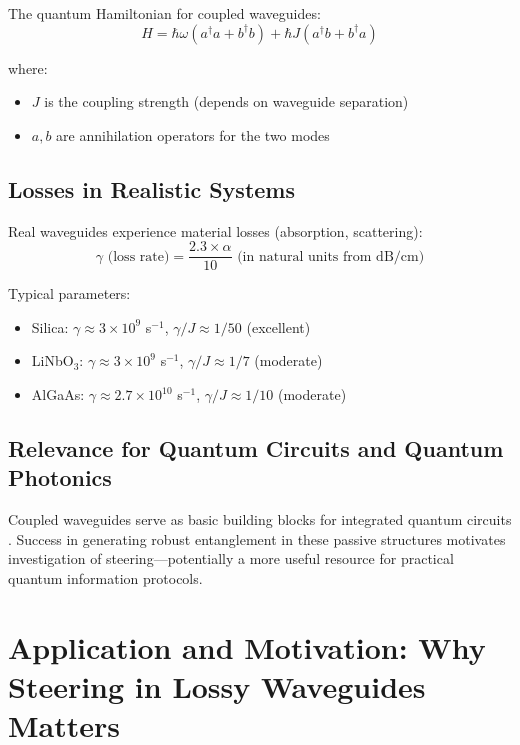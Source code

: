 The quantum Hamiltonian for coupled waveguides:
\begin{equation}
H = \hbar\omega(a^\dagger a + b^\dagger b) + \hbar J(a^\dagger b + b^\dagger a)
\end{equation}

where:
\begin{itemize}
	\item $J$ is the coupling strength (depends on waveguide separation)
	\item $a, b$ are annihilation operators for the two modes
\end{itemize}

\subsection{Losses in Realistic Systems}

Real waveguides experience material losses (absorption, scattering):
\begin{equation}
\gamma \text{ (loss rate)} = \frac{2.3 \times \alpha}{10} \text{ (in natural units from dB/cm)}
\end{equation}

Typical parameters:
\begin{itemize}
	\item Silica: $\gamma \approx 3 \times 10^9$ s$^{-1}$, $\gamma/J \approx 1/50$ (excellent)
	\item LiNbO$_3$: $\gamma \approx 3 \times 10^9$ s$^{-1}$, $\gamma/J \approx 1/7$ (moderate)
	\item AlGaAs: $\gamma \approx 2.7 \times 10^{10}$ s$^{-1}$, $\gamma/J \approx 1/10$ (moderate)
\end{itemize}

\subsection{Relevance for Quantum Circuits and Quantum Photonics}

Coupled waveguides serve as basic building blocks for integrated quantum circuits \cite{PolitiSilicaonSilicon2008}. Success in generating robust entanglement in these passive structures motivates investigation of steering—potentially a more useful resource for practical quantum information protocols.

\section{Application and Motivation: Why Steering in Lossy Waveguides Matters}

